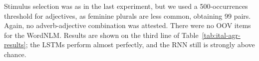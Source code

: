 Stimulus selection was as in the last experiment, but we used a 500-occurrences
threshold for adjectives, as feminine plurals are less common, obtaining 99 pairs. Again, no adverb-adjective combination was attested. %
There were no OOV items for the WordNLM. %
Results are shown on the third line of
Table~\ref{tab:ital-agr-results}; the LSTMs perform almost perfectly,
and the RNN still is strongly above chance.

